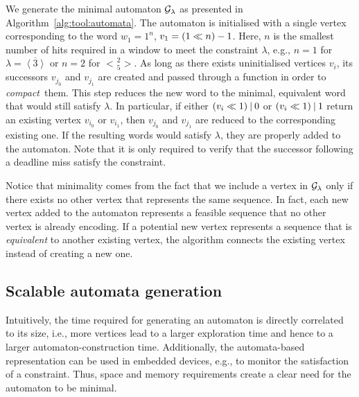 We generate the minimal automaton $\mathcal{G}_{\lambda}$ as presented in Algorithm~\ref{alg:tool:automata}.
The automaton is initialised with a single vertex corresponding to the word $w_1 = 1^n$, $v_1 = \left( 1 \ll n \right) - 1$.
Here, $n$ is the smallest number of hits required in a window to meet the constraint $\lambda$, e.g., $n=1$ for $\lambda = \overbar{\left<3\right>}$ or $n=2$ for $\genfrac{<}{>}{0pt}{}{2}{5}$.
As long as there exists uninitialised vertices $v_i$, its successors $v_{j_0}$ and $v_{j_1}$ are created and passed through a function in order to \emph{compact}~them.
This step reduces the new word to the minimal, equivalent word that would still satisfy $\lambda$.
In particular, if either $\left( v_i \ll 1 \right) \mathbin{|} 0$ or $\left( v_i \ll 1 \right) \mathbin{|} 1$ return an existing vertex $v_{i_0}$ or $v_{i_1}$, then $v_{j_0}$ and $v_{j_1}$ are reduced to the corresponding existing one.
If the resulting words would satisfy $\lambda$, they are properly added to the automaton.
Note that it is only required to verify that the successor following a deadline miss satisfy the constraint.

Notice that minimality comes from the fact that we include a vertex in $\mathcal{G}_{\lambda}$ only if there exists no other vertex that represents the same sequence.
In fact, each new vertex added to the automaton represents a feasible sequence that no other vertex is already encoding.
If a potential new vertex represents a sequence that is \emph{equivalent} to another existing vertex, the algorithm connects the existing vertex instead of creating a new one.

\subsection{Scalable automata generation}%
\label{sec:tool:scalability}%

Intuitively, the time required for generating an automaton is directly correlated to its size, i.e., more vertices lead to a larger exploration time and hence to a larger automaton-construction time. 
Additionally, the automata-based representation can be used in embedded devices, e.g., to monitor the satisfaction of a constraint.
Thus, space and memory requirements create a clear need for the automaton to be minimal.

